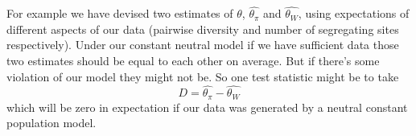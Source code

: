 For example we have devised two estimates of $\theta$,
$\widehat{\theta_{\pi}}$ and $\widehat{\theta_{W}}$, using
expectations of different aspects of our data (pairwise diversity and
number of segregating sites respectively). Under our constant neutral
model if we have sufficient data those two estimates should be
equal to each other on average. But if there's some violation of our model they might not
be. So one test statistic might be to take
\begin{equation}
D = \widehat{\theta_{\pi}} - \widehat{\theta_{W}}
\end{equation}
which will be zero in expectation if our data was generated by a
neutral constant population model.




\newpage
